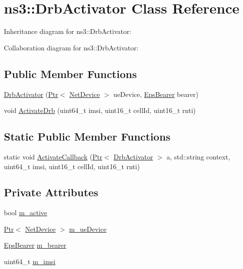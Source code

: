 \hypertarget{classns3_1_1DrbActivator}{}\section{ns3\+:\+:Drb\+Activator Class Reference}
\label{classns3_1_1DrbActivator}


Inheritance diagram for ns3\+:\+:Drb\+Activator\+:


Collaboration diagram for ns3\+:\+:Drb\+Activator\+:
\subsection*{Public Member Functions}
\begin{DoxyCompactItemize}
\item 
\hyperlink{classns3_1_1DrbActivator_a68c520f74c9eb7ffe2e37ba970cbaf20}{Drb\+Activator} (\hyperlink{classns3_1_1Ptr}{Ptr}$<$ \hyperlink{classns3_1_1NetDevice}{Net\+Device} $>$ ue\+Device, \hyperlink{structns3_1_1EpsBearer}{Eps\+Bearer} bearer)
\item 
void \hyperlink{classns3_1_1DrbActivator_ac2083f8538dcb7d2d907c4c503647765}{Activate\+Drb} (uint64\+\_\+t imsi, uint16\+\_\+t cell\+Id, uint16\+\_\+t rnti)
\end{DoxyCompactItemize}
\subsection*{Static Public Member Functions}
\begin{DoxyCompactItemize}
\item 
static void \hyperlink{classns3_1_1DrbActivator_aa625d98be8368e95b6fce83ba0e7d867}{Activate\+Callback} (\hyperlink{classns3_1_1Ptr}{Ptr}$<$ \hyperlink{classns3_1_1DrbActivator}{Drb\+Activator} $>$ a, std\+::string context, uint64\+\_\+t imsi, uint16\+\_\+t cell\+Id, uint16\+\_\+t rnti)
\end{DoxyCompactItemize}
\subsection*{Private Attributes}
\begin{DoxyCompactItemize}
\item 
bool \hyperlink{classns3_1_1DrbActivator_ae43059256ef63105b760dc715dafa4cf}{m\+\_\+active}
\item 
\hyperlink{classns3_1_1Ptr}{Ptr}$<$ \hyperlink{classns3_1_1NetDevice}{Net\+Device} $>$ \hyperlink{classns3_1_1DrbActivator_aaf698604ccc229d99c944a390222e9b4}{m\+\_\+ue\+Device}
\item 
\hyperlink{structns3_1_1EpsBearer}{Eps\+Bearer} \hyperlink{classns3_1_1DrbActivator_a2ff495714c871e28e112fa5d4d8efb53}{m\+\_\+bearer}
\item 
uint64\+\_\+t \hyperlink{classns3_1_1DrbActivator_a409d601e99df7e2c18fb827115e52695}{m\+\_\+imsi}
\end{DoxyCompactItemize}


